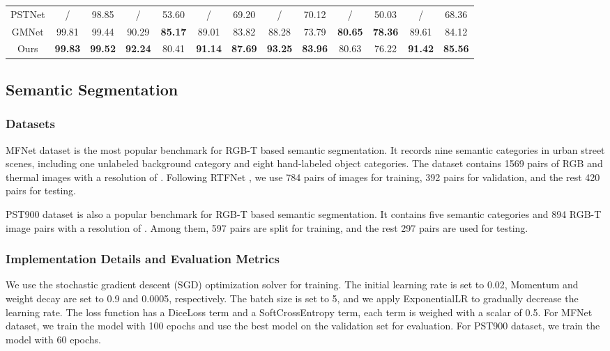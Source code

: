 \documentclass[letterpaper, 10 pt, journal, twoside]{IEEEtran}
\begin{document}
\begin{table*}[t!]
\begin{tabular}{cccccccccccccc}
    \multicolumn{2}{c}{PSTNet\cite{pst900}} & /     & 98.85  & /     & 53.60  & /     & 69.20  & /     & 70.12  & /     & 50.03  & /     & 68.36  \\
    \multicolumn{2}{c}{GMNet\cite{GMNet}} & 99.81 & 99.44  & 90.29  & \textbf{85.17} & 89.01  & 83.82  & 88.28  & 73.79  & \textbf{80.65}  & \textbf{78.36}  & 89.61  & 84.12  \\
    \multicolumn{2}{c}{Ours} & \textbf{99.83} & \textbf{99.52} & \textbf{92.24} & 80.41& \textbf{91.14} & \textbf{87.69} & \textbf{93.25} & \textbf{83.96} & 80.63 & 76.22 & \textbf{91.42}  & \textbf{85.56} \\
    \bottomrule
    \end{tabular}\label{res_pst}\end{table*}



\subsection{Semantic Segmentation}

\subsubsection{Datasets}

MFNet dataset \cite{MFNet} is the most popular benchmark for RGB-T based semantic segmentation. It records nine semantic categories in urban street scenes, including one unlabeled background category and eight hand-labeled object categories. The dataset contains 1569 pairs of RGB and thermal images with a resolution of . 
Following RTFNet \cite{RTFNet}, we use 784 pairs of images for training, 392 pairs for validation, and the rest 420 pairs for testing.


PST900 dataset \cite{pspnet} is also a popular benchmark for RGB-T based semantic segmentation. It contains five semantic categories and 894 RGB-T image pairs with a resolution of . Among them, 597 pairs are split for training, and the rest 297 pairs are used for testing. 



\subsubsection{Implementation Details and Evaluation Metrics}
We use the stochastic gradient descent (SGD)\cite{SGD} optimization solver for training. The initial learning rate is set to 0.02, Momentum and weight decay are set to 0.9 and 0.0005, respectively.  The batch size is set to 5, and we apply ExponentialLR to gradually decrease the learning rate. 
The loss function has a 
DiceLoss \cite{Dice} term and a SoftCrossEntropy \cite{soft} term, each term is weighed with a scalar of 0.5.
For MFNet dataset, we train the model with 100 epochs and use the best model on the validation set for evaluation.
For PST900 dataset, we train the model with 60 epochs. 
\end{document}
